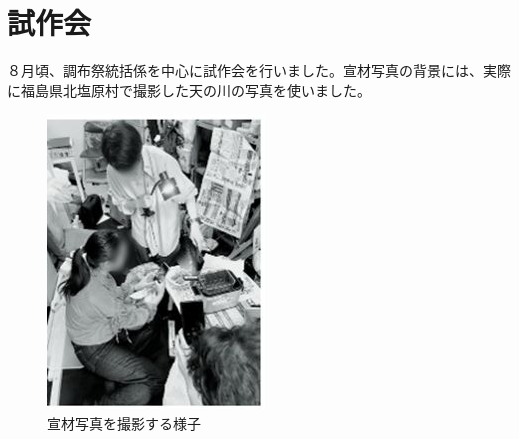 \documentclass[../super_nova_20yy]{subfiles}
\begin{document}
\section{試作会}
８月頃、調布祭統括係を中心に試作会を行いました。宣材写真の背景には、実際に福島県北塩原村で撮影した天の川の写真を使いました。
\begin{figure}[H]
  \centering
  \begin{minipage}[t]{0.4\columnwidth}
    \centering
    \includegraphics[width=\columnwidth]{画像2.jpg}
    \caption{宣材写真を撮影する様子}
    \label{fig:2}
  \end{minipage}
  \begin{minipage}[t]{0.4\columnwidth}
    \centering

\end{minipage}
\end{figure}
\end{document}
